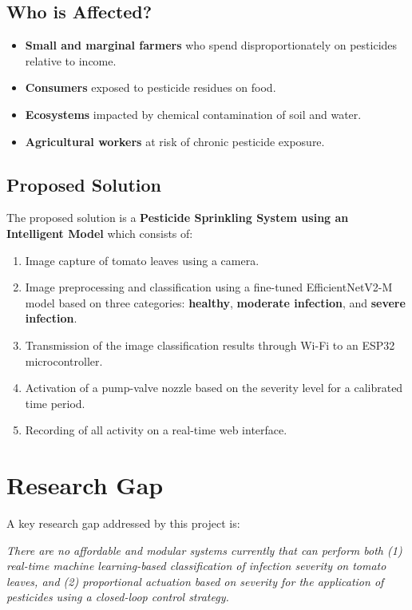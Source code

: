 \documentclass[12pt,a4paper,oneside]{report}
\begin{document}
\subsection{Who is Affected?}

\begin{itemize}[leftmargin=2em]
    \item \textbf{Small and marginal farmers} who spend disproportionately on pesticides relative to income.
    \item \textbf{Consumers} exposed to pesticide residues on food.
    \item \textbf{Ecosystems} impacted by chemical contamination of soil and water.
    \item \textbf{Agricultural workers} at risk of chronic pesticide exposure.
\end{itemize}

\subsection{Proposed Solution}

The proposed solution is a \textbf{Pesticide Sprinkling System using an Intelligent Model} which consists of:

\begin{enumerate}[leftmargin=2em]
    \item Image capture of tomato leaves using a camera.
    \item Image preprocessing and classification using a fine-tuned EfficientNetV2-M model based on three categories: \textbf{healthy}, \textbf{moderate infection}, and \textbf{severe infection}.
    \item Transmission of the image classification results through Wi-Fi to an ESP32 microcontroller.
    \item Activation of a pump-valve nozzle based on the severity level for a calibrated time period.
    \item Recording of all activity on a real-time web interface.
\end{enumerate}

\section{Research Gap}

A key research gap addressed by this project is:

\begin{mdframed}[linewidth=1pt, linecolor=black!70, backgroundcolor=gray!8]
\textit{There are no affordable and modular systems currently that can perform both (1) real-time machine learning-based classification of infection severity on tomato leaves, and (2) proportional actuation based on severity for the application of pesticides using a closed-loop control strategy.}
\end{mdframed}
\end{document}
